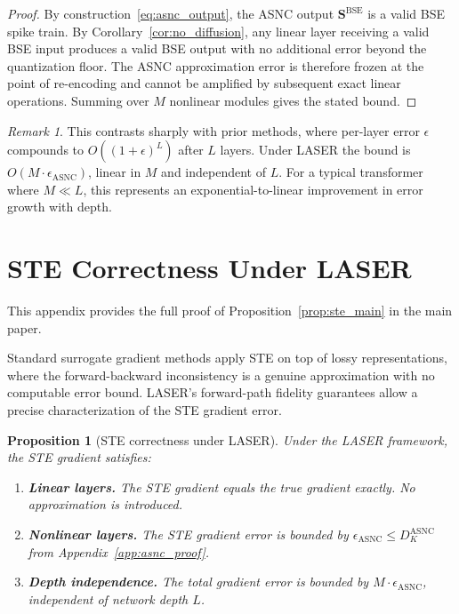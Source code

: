 \documentclass{article}
\theoremstyle{plain}
\newtheorem{proposition}[theorem]{Proposition}
\theoremstyle{definition}
\theoremstyle{remark}
\newtheorem{remark}[theorem]{Remark}
\begin{document}
\begin{proof}
By construction~\eqref{eq:asnc_output}, the ASNC output $\mathbf{S}^{\mathrm{BSE}}$
is a valid BSE spike train. By Corollary~\ref{cor:no_diffusion}, any linear layer
receiving a valid BSE input produces a valid BSE output with no additional error
beyond the quantization floor. The ASNC approximation error is therefore frozen at
the point of re-encoding and cannot be amplified by subsequent exact linear
operations. Summing over $M$ nonlinear modules gives the stated bound.
\end{proof}

\begin{remark}
This contrasts sharply with prior methods, where per-layer error $\epsilon$ compounds
to $O((1+\epsilon)^L)$ after $L$ layers. Under LASER the bound is
$O(M \cdot \epsilon_{\mathrm{ASNC}})$, linear in $M$ and independent of $L$. For a
typical transformer where $M \ll L$, this represents an exponential-to-linear
improvement in error growth with depth.
\end{remark}


\section{STE Correctness Under LASER}
\label{app:ste_proof}

This appendix provides the full proof of Proposition~\ref{prop:ste_main} in the main
paper.

Standard surrogate gradient methods apply STE on top of lossy representations, where
the forward-backward inconsistency is a genuine approximation with no computable error
bound. LASER's forward-path fidelity guarantees allow a precise characterization of
the STE gradient error.

\begin{proposition}[STE correctness under LASER]
\label{prop:ste_correct}
Under the LASER framework, the STE gradient satisfies:
\begin{enumerate}[label=(\roman*),leftmargin=*]
  \item \textbf{Linear layers.} The STE gradient equals the true gradient exactly.
        No approximation is introduced.
  \item \textbf{Nonlinear layers.} The STE gradient error is bounded by
        $\epsilon_{\mathrm{ASNC}} \le D_K^{\mathrm{ASNC}}$
        from Appendix~\ref{app:asnc_proof}.
  \item \textbf{Depth independence.} The total gradient error is bounded by
        $M \cdot \epsilon_{\mathrm{ASNC}}$, independent of network depth $L$.
\end{enumerate}
\end{proposition}
\end{document}
